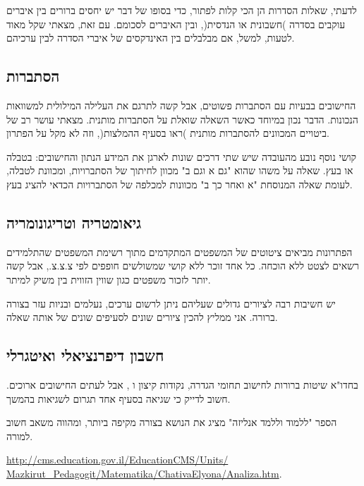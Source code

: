 לדעתי, שאלות הסדרות הן הכי קלות לפתור, כדי בסופו של דבר יש יחסים ברורים בין איברים עוקבים בסדרה )חשבונית או הנדסית(, ובין האיברים לסכומם. עם זאת, מצאתי שקל מאוד לטעות, למשל, אם מבלבלים בין האינדקסים של איברי הסדרה לבין ערכיהם.


\subsection*{הסתברות}

החישובים בבעיות עם הסתברות פשוטים, אבל קשה לתרגם את העלילה המילולית למשוואות הנכונות. הדבר נכון במיוחד כאשר השאלה שואלת על הסתברות מותנית. מצאתי עושר רב של ביטויים המכוונים להסתברות מותנית )ראו בסעיף ההמלצות(, וזה לא מקל על הפתרון.

\np

קושי נוסף נובע מהעובדה שיש שתי דרכים שונות לארגן את המידע הנתון והחישובים: בטבלה או בעץ. שאלה על משהו שהוא "גם א וגם ב" מכוון לחיתוך של הסתברויות, ומכוונת לטבלה, לעומת שאלה המנוסחת "א ואחר כך ב" מכוונות למכלפה של הסתברויות הכדאי להציג בעץ.

\subsection*{גיאומטריה וטריגונומריה}


הפתרונות מביאים ציטוטים של המשפטים המתקדמים מתוך רשימת המשפטים שהתלמידים רשאים לצטט ללא הוכחה. כל אחד זוכר ללא קושי שמשולשים חופפים לפי צ.צ.צ., אבל קשה יותר לזכור משפטים כגון שווין הזווית בין משיק למיתר.

יש חשיבות רבה לציורים גדולים שעליהם ניתן לרשום ערכים, נעלמים ובניות עזר בצורה ברורה. אני ממליץ להכין ציורים שונים לסעיפים שונים של אותה שאלה.

\subsection*{חשבון דיפרנציאלי ואיטגרלי}

בחדו"א שיטות ברורות לחישוב תחומי הגדרה, נקודות קיצון ו%
\asms{},
אבל לעתים החישובים ארוכים. חשוב לדייק כי שגיאה בסעיף אחד תגרום לשגיאות בהמשך.

הספר "ללמוד וללמד אנליזה" מציג את הנושא בצורה מקיפה ביותר, ומהווה משאב חשוב למורה.

\begin{small}
\url{http://cms.education.gov.il/EducationCMS/Units/}\\\hspace*{3em}\url{Mazkirut_Pedagogit/Matematika/ChativaElyona/Analiza.htm}.
\end{small}

